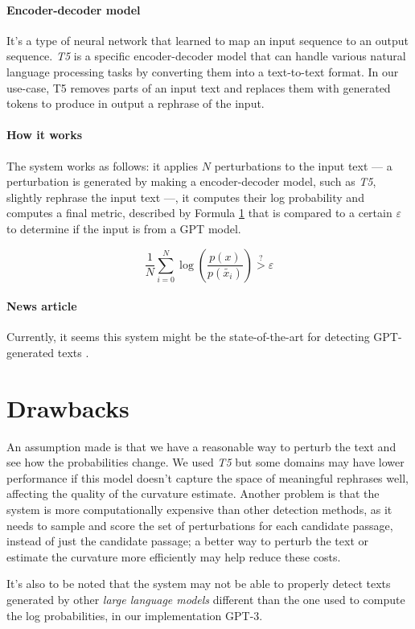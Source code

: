 \paragraph{Encoder-decoder model}
It's a type of neural network that learned to map an input sequence to an output sequence. \textit{T5} is a specific encoder-decoder model that can handle various natural language processing tasks by converting them into a text-to-text format. In our use-case, T5 removes parts of an input text and replaces them with generated tokens to produce in output a rephrase of the input.

\paragraph{How it works}
The system works as follows: it applies $N$ perturbations to the input text --- a perturbation is generated by making a encoder-decoder model, such as \textit{T5}, slightly rephrase the input text ---, it computes their log probability and computes a final metric, described by Formula \ref{formula:logprobmetric} that is compared to a certain $\varepsilon$ to determine if the input is from a GPT model.

\begin{figure}[H]
	\centering
	\label{formula:logprobmetric}
	\begin{equation}
		\dfrac{1}{N} \sum_{i = 0}^{N}
		\log\left(
		\dfrac{p(x)}{p(\tilde{x_i})}
		\right)
		\stackrel{?}{>}
		\varepsilon
	\end{equation}
\end{figure}

\paragraph{News article}
Currently, it seems this system might be the state-of-the-art for detecting GPT-generated texts \cite{state-of-the-art-article}.

\section{Drawbacks}

An assumption made is that we have a reasonable way to perturb the text and see how the probabilities change. We used \textit{T5} but some domains may have lower performance if this model doesn't capture the space of meaningful rephrases well, affecting the quality of the curvature estimate. Another problem is that the system is more computationally expensive than other detection methods, as it needs to sample and score the set of perturbations for each candidate passage, instead of just the candidate passage; a better way to perturb the text or estimate the curvature more efficiently may help reduce these costs.

It's also to be noted that the system may not be able to properly detect texts generated by other \textit{large language models} different than the one used to compute the log probabilities, in our implementation GPT-3.